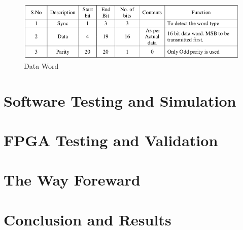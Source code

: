 \documentclass[12pt,a4paper]{report}
\begin{document}
\begin{figure}[h]
	\centering
	\includegraphics[scale=.38]{data.png}
	\caption{Data Word}
	\label{fig:data}
\end{figure}



\chapter{Software Testing and Simulation}
\chapter{FPGA Testing and Validation}
\chapter{The Way Foreward}
\chapter{Conclusion and Results}
\end{document}
